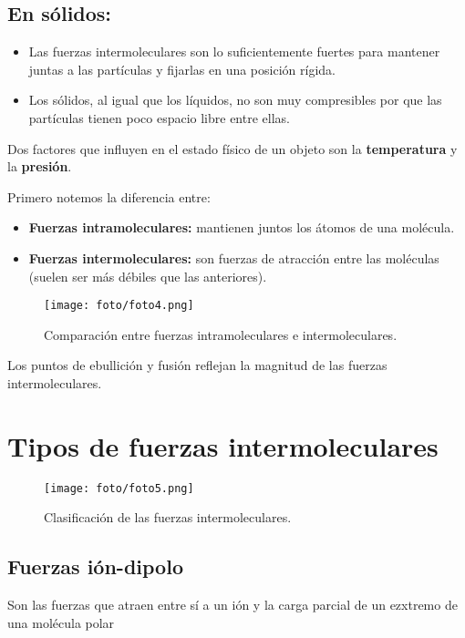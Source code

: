 \documentclass[]{article}
\begin{document}
\subsection{En sólidos:}  

\begin{itemize}
	\item Las fuerzas intermoleculares son lo suficientemente fuertes para mantener juntas a las partículas y fijarlas en una posición rígida.
	\item Los sólidos, al igual que los líquidos, no son muy compresibles por que las partículas tienen poco espacio libre entre ellas.
\end{itemize}

Dos factores que influyen en el estado físico de un objeto son la \textbf{temperatura} y la \textbf{presión}.

Primero notemos la diferencia entre:

\begin{itemize}
	\item \textbf{Fuerzas intramoleculares:} mantienen juntos los átomos de una molécula.
	\item \textbf{Fuerzas intermoleculares:} son fuerzas de atracción entre las moléculas (suelen ser más débiles que las anteriores).
\end{itemize}

\begin{figure}[H]
\center
\texttt{[image: foto/foto4.png]}
\caption{Comparación entre fuerzas intramoleculares e intermoleculares.}
\end{figure}

Los puntos de ebullición y fusión reflejan la magnitud de las fuerzas intermoleculares.



\section{Tipos de fuerzas intermoleculares}

\begin{figure}[H]
\center
\texttt{[image: foto/foto5.png]}
\caption{Clasificación de las fuerzas intermoleculares.}
\end{figure}



\subsection{Fuerzas ión-dipolo}
Son las fuerzas que atraen entre sí a un ión y la carga parcial de un ezxtremo de una molécula polar
\end{document}
